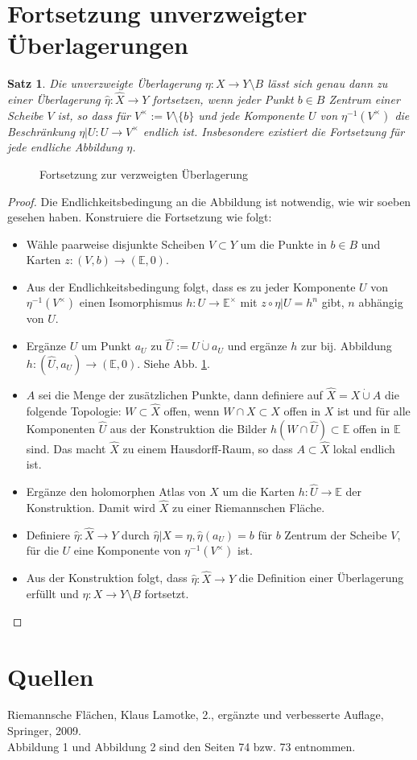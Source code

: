 \documentclass[12pt,a4paper]{article}
\theoremstyle{plain}
\newtheorem*{Satz}[Theorem]{Satz}
\newcommand{\cupdot}{\mathbin{\dot{\cup}}}
\numberwithin{equation}{section}
\begin{document}
\section*{Fortsetzung unverzweigter Überlagerungen}
\begin{Satz} Die unverzweigte Überlagerung $\eta: X\rightarrow Y\setminus B$ lässt sich genau dann zu einer Überlagerung $\hat{\eta}: \hat{X} \rightarrow Y$ fortsetzen, wenn jeder Punkt $b\in B$ Zentrum einer Scheibe $V$ ist, so dass für $V^\times:=V\setminus\{b\}$ und jede Komponente $U$ von $\eta^{-1}(V^\times)$ die Beschränkung $\eta|U: U\rightarrow V^\times$ endlich ist. Insbesondere existiert die Fortsetzung für jede endliche Abbildung $\eta$.
\end{Satz}
\begin{figure} \def\svgwidth{\textwidth}  \caption{Fortsetzung zur  verzweigten Überlagerung}\label{KVUe}
\end{figure}
\begin{proof}
Die Endlichkeitsbedingung an die Abbildung ist notwendig, wie wir soeben gesehen haben. Konstruiere die Fortsetzung wie folgt:
\begin{itemize}
\item Wähle paarweise disjunkte Scheiben $V\subset Y$ um die Punkte in $b\in B$ und Karten $z:(V,b)\rightarrow (\mathbb{E},0)$.
\item Aus der Endlichkeitsbedingung folgt, dass es zu jeder Komponente $U$ von $\eta^{-1}(V^\times)$ einen Isomorphismus $h: U\rightarrow \mathbb{E}^\times$ mit $z\circ \eta|U = h^n$ gibt, $n$ abhängig von $U$.
\item Ergänze $U$ um Punkt $a_U$ zu $\hat{U}:=U\cupdot a_U$ und ergänze $h$ zur bij. Abbildung $h: (\hat{U},a_U) \rightarrow (\mathbb{E},0)$. Siehe Abb. \ref{KVUe}.
\item $A$ sei die Menge der zusätzlichen Punkte, dann definiere auf $\hat{X} = X \cupdot A$ die folgende Topologie: $W\subset \hat{X}$ offen, wenn $W\cap X \subset X$ offen in $X$ ist und für alle Komponenten $\hat{U}$ aus der Konstruktion die Bilder $h(W\cap \hat{U})\subset \mathbb{E}$ offen in $\mathbb{E}$ sind. Das macht $\hat{X}$ zu einem Hausdorff-Raum, so dass $A\subset \hat{X}$ lokal endlich ist.
\item Ergänze den holomorphen Atlas von $X$ um die Karten $h:\hat{U}\rightarrow \mathbb{E}$ der Konstruktion. Damit wird $\hat{X}$ zu einer Riemannschen Fläche.
\item Definiere $\hat{\eta}: \hat{X}\rightarrow Y$ durch $\hat{\eta}|X = \eta, \hat{\eta}(a_U)=b$ für $b$ Zentrum der Scheibe $V$, für die $U$ eine Komponente von $\eta^{-1}(V^\times)$ ist.
\item Aus der Konstruktion folgt, dass $\hat{\eta}:\hat{X}\rightarrow Y$ die Definition einer Überlagerung erfüllt und $\eta: X\rightarrow Y\setminus B$ fortsetzt.
\end{itemize}
\end{proof}
\section*{Quellen}
Riemannsche Flächen, Klaus Lamotke, 2., ergänzte und verbesserte Auflage, Springer, 2009.\\
Abbildung 1 und Abbildung 2 sind den Seiten 74 bzw. 73 entnommen.
\end{document}
